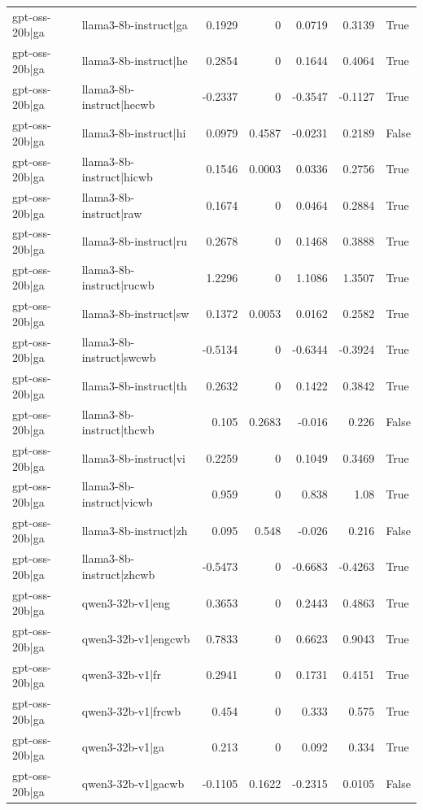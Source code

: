 \begin{table}
\begin{tabular}{l l r r r r l}
gpt-oss-20b|ga & llama3-8b-instruct|ga & 0.1929 & 0 & 0.0719 & 0.3139 & True \\
gpt-oss-20b|ga & llama3-8b-instruct|he & 0.2854 & 0 & 0.1644 & 0.4064 & True \\
gpt-oss-20b|ga & llama3-8b-instruct|hecwb & -0.2337 & 0 & -0.3547 & -0.1127 & True \\
gpt-oss-20b|ga & llama3-8b-instruct|hi & 0.0979 & 0.4587 & -0.0231 & 0.2189 & False \\
gpt-oss-20b|ga & llama3-8b-instruct|hicwb & 0.1546 & 0.0003 & 0.0336 & 0.2756 & True \\
gpt-oss-20b|ga & llama3-8b-instruct|raw & 0.1674 & 0 & 0.0464 & 0.2884 & True \\
gpt-oss-20b|ga & llama3-8b-instruct|ru & 0.2678 & 0 & 0.1468 & 0.3888 & True \\
gpt-oss-20b|ga & llama3-8b-instruct|rucwb & 1.2296 & 0 & 1.1086 & 1.3507 & True \\
gpt-oss-20b|ga & llama3-8b-instruct|sw & 0.1372 & 0.0053 & 0.0162 & 0.2582 & True \\
gpt-oss-20b|ga & llama3-8b-instruct|swcwb & -0.5134 & 0 & -0.6344 & -0.3924 & True \\
gpt-oss-20b|ga & llama3-8b-instruct|th & 0.2632 & 0 & 0.1422 & 0.3842 & True \\
gpt-oss-20b|ga & llama3-8b-instruct|thcwb & 0.105 & 0.2683 & -0.016 & 0.226 & False \\
gpt-oss-20b|ga & llama3-8b-instruct|vi & 0.2259 & 0 & 0.1049 & 0.3469 & True \\
gpt-oss-20b|ga & llama3-8b-instruct|vicwb & 0.959 & 0 & 0.838 & 1.08 & True \\
gpt-oss-20b|ga & llama3-8b-instruct|zh & 0.095 & 0.548 & -0.026 & 0.216 & False \\
gpt-oss-20b|ga & llama3-8b-instruct|zhcwb & -0.5473 & 0 & -0.6683 & -0.4263 & True \\
gpt-oss-20b|ga & qwen3-32b-v1|eng & 0.3653 & 0 & 0.2443 & 0.4863 & True \\
gpt-oss-20b|ga & qwen3-32b-v1|engcwb & 0.7833 & 0 & 0.6623 & 0.9043 & True \\
gpt-oss-20b|ga & qwen3-32b-v1|fr & 0.2941 & 0 & 0.1731 & 0.4151 & True \\
gpt-oss-20b|ga & qwen3-32b-v1|frcwb & 0.454 & 0 & 0.333 & 0.575 & True \\
gpt-oss-20b|ga & qwen3-32b-v1|ga & 0.213 & 0 & 0.092 & 0.334 & True \\
gpt-oss-20b|ga & qwen3-32b-v1|gacwb & -0.1105 & 0.1622 & -0.2315 & 0.0105 & False \\

\end{tabular}
\end{table}
